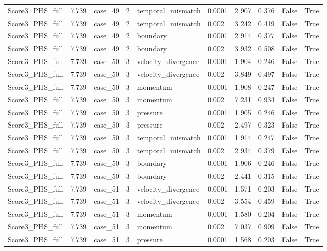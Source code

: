 \begin{longtable}{llllllllll}
Score3\_PHS\_full & 7.739 & case\_49 & 2 & temporal\_mismatch & 0.0001 & 2.907 & 0.376 & False & True \\
Score3\_PHS\_full & 7.739 & case\_49 & 2 & temporal\_mismatch & 0.002 & 3.242 & 0.419 & False & True \\
Score3\_PHS\_full & 7.739 & case\_49 & 2 & boundary & 0.0001 & 2.914 & 0.377 & False & True \\
Score3\_PHS\_full & 7.739 & case\_49 & 2 & boundary & 0.002 & 3.932 & 0.508 & False & True \\
Score3\_PHS\_full & 7.739 & case\_50 & 3 & velocity\_divergence & 0.0001 & 1.904 & 0.246 & False & True \\
Score3\_PHS\_full & 7.739 & case\_50 & 3 & velocity\_divergence & 0.002 & 3.849 & 0.497 & False & True \\
Score3\_PHS\_full & 7.739 & case\_50 & 3 & momentum & 0.0001 & 1.908 & 0.247 & False & True \\
Score3\_PHS\_full & 7.739 & case\_50 & 3 & momentum & 0.002 & 7.231 & 0.934 & False & True \\
Score3\_PHS\_full & 7.739 & case\_50 & 3 & pressure & 0.0001 & 1.905 & 0.246 & False & True \\
Score3\_PHS\_full & 7.739 & case\_50 & 3 & pressure & 0.002 & 2.497 & 0.323 & False & True \\
Score3\_PHS\_full & 7.739 & case\_50 & 3 & temporal\_mismatch & 0.0001 & 1.914 & 0.247 & False & True \\
Score3\_PHS\_full & 7.739 & case\_50 & 3 & temporal\_mismatch & 0.002 & 2.934 & 0.379 & False & True \\
Score3\_PHS\_full & 7.739 & case\_50 & 3 & boundary & 0.0001 & 1.906 & 0.246 & False & True \\
Score3\_PHS\_full & 7.739 & case\_50 & 3 & boundary & 0.002 & 2.441 & 0.315 & False & True \\
Score3\_PHS\_full & 7.739 & case\_51 & 3 & velocity\_divergence & 0.0001 & 1.571 & 0.203 & False & True \\
Score3\_PHS\_full & 7.739 & case\_51 & 3 & velocity\_divergence & 0.002 & 3.554 & 0.459 & False & True \\
Score3\_PHS\_full & 7.739 & case\_51 & 3 & momentum & 0.0001 & 1.580 & 0.204 & False & True \\
Score3\_PHS\_full & 7.739 & case\_51 & 3 & momentum & 0.002 & 7.037 & 0.909 & False & True \\
Score3\_PHS\_full & 7.739 & case\_51 & 3 & pressure & 0.0001 & 1.568 & 0.203 & False & True \\

\end{longtable}
